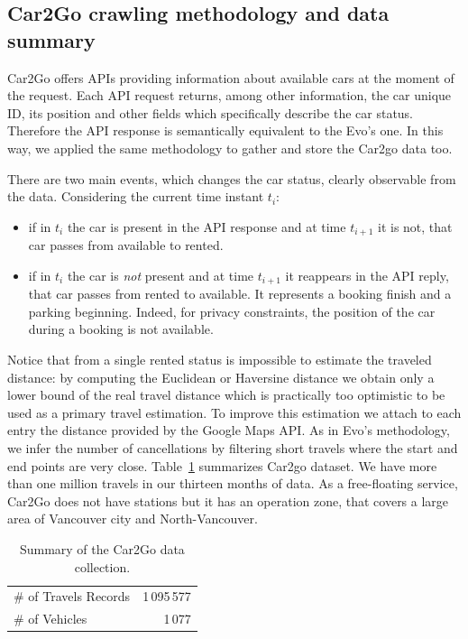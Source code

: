 \subsection{Car2Go crawling methodology and data summary}

Car2Go offers APIs providing information about available cars at the moment of the request. Each API request returns, among other information, the car unique ID, its position and other fields which specifically describe the car status. Therefore the API response is semantically equivalent to the Evo's one. In this way, we applied the same methodology to gather and store the Car2go data too.

There are two main events, which changes the car status, clearly observable from the data. Considering the current time instant $t_i$: 
\begin{itemize}
     \item if in $t_i$ the car is present in the API response and at time $t_{i+1}$ it is not, that car passes from available to rented. %
     \item if in $t_i$ the car is \emph{not} present and at time $t_{i+1}$ it reappears in the API reply, that car passes from rented  to available. It represents a booking finish and a parking beginning.  Indeed, for privacy constraints, the position of the car during a booking is not available.
\end{itemize}

Notice that from a single rented status is impossible to estimate the traveled distance: by computing the Euclidean or Haversine 
distance we obtain only a lower bound of the real travel distance which is practically too optimistic to be used as a primary travel estimation. To improve this estimation we attach to each entry the distance provided by the Google Maps API. 
As in Evo's methodology, we infer the number of cancellations by filtering short travels where the start and end points are very close. Table~\ref{table:dataCar2Go} summarizes Car2go dataset. We have more than one million travels in our thirteen months of data. As a free-floating service, Car2Go does not have stations but it has an operation zone, that covers a large area of Vancouver city and North-Vancouver. 

\begin{table}[htb]
\centering
\scriptsize
\begin{tabular}{llr}
\hline
\multicolumn{2}{l}{\# of Travels Records} & 1\,095\,577\\
\multicolumn{2}{l}{\# of Vehicles} & 1\,077
\\\hline
\end{tabular}
\caption{Summary of the Car2Go data collection.}
\label{table:dataCar2Go}
\end{table}